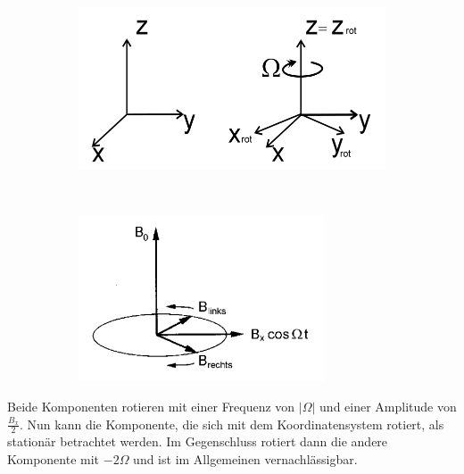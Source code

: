 \begin{figure}[hbtp]
\caption{Rotierendes Koordinatensystem.}
\centering
	\begin{subfigure}[t]{0.4\textwidth}
	\includegraphics[width=\textwidth]{Plots/rotKoordinatensystem.png} 
	\label{rotK1}
	\end{subfigure}
	~
	~
	\begin{subfigure}[t]{0.4\textwidth}
	\includegraphics[width=0.8\textwidth]{Plots/B1Felder.png}
	\label{rotK2}
	\end{subfigure}
\label{rotKoordi}
\end{figure}
Beide Komponenten rotieren mit einer Frequenz von $|\Omega|$ und einer Amplitude von $\frac{B_x}{2}$.
Nun kann die Komponente, die sich mit dem Koordinatensystem rotiert, als station\"{a}r betrachtet werden.
Im Gegenschluss rotiert dann die andere Komponente mit $-2\Omega$ und ist im Allgemeinen vernachl\"{a}ssigbar.

